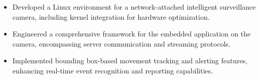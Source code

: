 \begin{itemize}
  \item Developed a Linux environment for a network-attached intelligent surveillance camera, including kernel integration for hardware optimization.
  \item Engineered a comprehensive framework for the embedded application on the camera, encompassing server communication and streaming protocols.
  \item Implemented bounding box-based movement tracking and alerting features, enhancing real-time event recognition and reporting capabilities.
\end{itemize}
\divider
